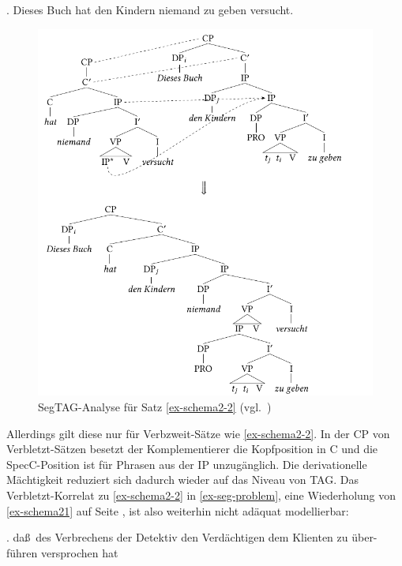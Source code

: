 \ex. {Dieses Buch} hat {den Kindern} niemand {zu geben} versucht.\label{ex-schema2-2} 

\begin{figure}[p] 
\centering
\includegraphics{graphics/abb613.pdf}
\caption{SegTAG-Analyse für Satz \ref{ex-schema2-2} (vgl.\ \citealt[(130) ,(131)]{Kulick:00})\label{fig-seg-ling1}}
\end{figure}

\noindent Allerdings gilt diese  nur für Verbzweit-Sätze wie \ref{ex-schema2-2}. In der CP von Verbletzt-Sätzen besetzt der Komplementierer die Kopfposition in C und die SpecC-Position ist für Phrasen aus der IP unzugänglich. Die derivationelle Mächtigkeit reduziert sich dadurch wieder auf das Niveau von TAG. Das Verbletzt-Korrelat zu \ref{ex-schema2-2} in \ref{ex-seg-problem}, eine Wiederholung von \ref{ex-schema21} auf Seite \pageref{ex-schema21}, ist also weiterhin nicht adäquat modellierbar: 

\ex. da\ss \ des Verbrechens der Detektiv den Verdächtigen dem Klienten zu über-\linebreak führen versprochen hat\label{ex-seg-problem}


